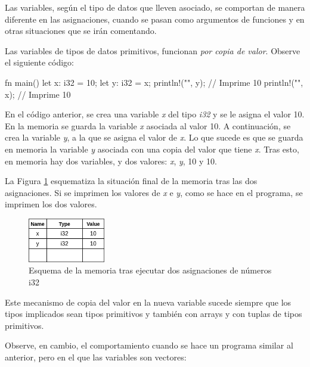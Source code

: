 Las variables, según el tipo de datos que lleven asociado, se comportan de manera diferente en las asignaciones, cuando se pasan como argumentos de funciones y en otras situaciones que se irán comentando.

Las variables de tipos de datos primitivos, funcionan \textit{por copia de valor}. Observe el siguiente código:

\vspace{0.7em}
\begin{Codigo}
fn main() {
   let x: i32 = 10;
   let y: i32 = x;
   println!("{}", y); // Imprime 10
   println!("{}", x); // Imprime 10
}
\end{Codigo}

En el código anterior, se crea una variable \textit{x} del tipo \textit{i32} y se le asigna el valor 10. En la memoria se guarda la variable \textit{x} asociada al valor 10. A continuación, se crea la variable \textit{y}, a la que se asigna el valor de \textit{x}. Lo que sucede es que se guarda en memoria la variable \textit{y} asociada con una copia del valor que tiene \textit{x}. Tras esto, en memoria hay dos variables, y dos valores: \textit{x}, \textit{y}, 10 y 10. 

La Figura \ref{fig_memoria_2} esquematiza la situación final de la memoria tras las dos asignaciones. Si se imprimen los valores de \textit{x} e \textit{y}, como se hace en el programa, se imprimen los dos valores.

\begin{figure}[htb]
   \begin{center}
      \includegraphics[width=0.3\textwidth]{img/memoria_2.png}
      \caption{Esquema de la memoria tras ejecutar dos asignaciones de números i32}
      \label{fig_memoria_2}
   \end{center}
\end{figure}

Este mecanismo de copia del valor en la nueva variable sucede siempre que los tipos implicados sean tipos primitivos y también con arrays y con tuplas de tipos primitivos. 

Observe, en cambio, el comportamiento cuando se hace un programa similar al anterior, pero en el que las variables son vectores:

